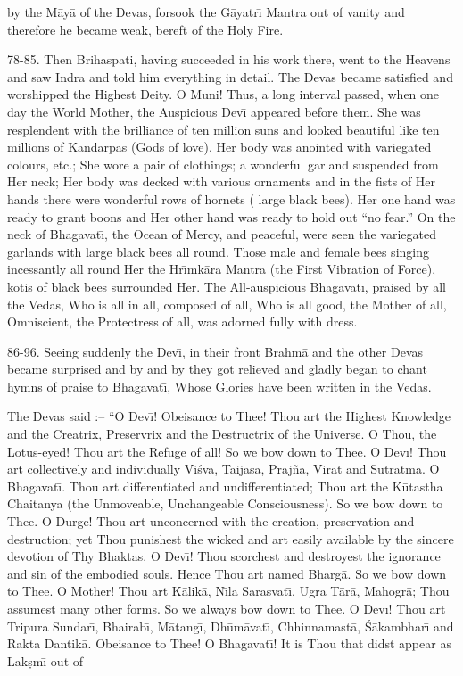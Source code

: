 by the M\=ay\=a of the Devas, forsook the G\=ayatr\={\i} Mantra out of vanity and therefore he became weak, bereft of the Holy Fire.

78-85. Then Brihaspati, having succeeded in his work there, went to the Heavens and saw Indra and told him everything in detail. The Devas became satisfied and worshipped the Highest Deity. O Muni! Thus, a long interval passed, when one day the World Mother, the Auspicious Dev\={\i} appeared before them. She was resplendent with the brilliance of ten million suns and looked beautiful like ten millions of Kandarpas (Gods of love). Her body was anointed with variegated colours, etc.; She wore a pair of clothings; a wonderful garland suspended from Her neck; Her body was decked with various ornaments and in the fists of Her hands there were wonderful rows of hornets ( large black bees). Her one hand was ready to grant boons and Her other hand was ready to hold out ``no fear.'' On the neck of Bhagavat\={\i}, the Ocean of Mercy, and peaceful, were seen the variegated garlands with large black bees all round. Those male and female bees singing incessantly all round Her the Hr\={\i}mk\=ara Mantra (the First Vibration of Force), kotis of black bees surrounded Her. The All-auspicious Bhagavat\={\i}, praised by all the Vedas, Who is all in all, composed of all, Who is all good, the Mother of all, Omniscient, the Protectress of all, was adorned fully with dress.

86-96. Seeing suddenly the Dev\={\i}, in their front Brahm\=a and the other Devas became surprised and by and by they got relieved and gladly began to chant hymns of praise to Bhagavat\={\i}, Whose Glories have been written in the Vedas.

The Devas said :-- ``O Dev\={\i}! Obeisance to Thee! Thou art the Highest Knowledge and the Creatrix, Preservrix and the Destructrix of the Universe. O Thou, the Lotus-eyed! Thou art the Refuge of all! So we bow down to Thee. O Dev\={\i}! Thou art collectively and individually Vi\'sva, Taijasa, Pr\=aj\~na, Vir\=at and S\=utr\=atm\=a. O Bhagavat\={\i}. Thou art differentiated and undifferentiated; Thou art the K\=utastha Chaitanya (the Unmoveable, Unchangeable Consciousness). So we bow down to Thee. O Durge! Thou art unconcerned with the creation, preservation and destruction; yet Thou punishest the wicked and art easily available by the sincere devotion of Thy Bhaktas. O Dev\={\i}! Thou scorchest and destroyest the ignorance and sin of the embodied souls. Hence Thou art named Bharg\=a. So we bow down to Thee. O Mother! Thou art K\=alik\=a, N\={\i}la Sarasvat\={\i}, Ugra T\=ar\=a, Mahogr\=a; Thou assumest many other forms. So we always bow down to Thee. O Dev\={\i}! Thou art Tripura Sundar\={\i}, Bhairab\={\i}, M\=atang\={\i}, Dh\=um\=avat\={\i}, Chhinnamast\=a, \'S\=akambhar\={\i} and Rakta Dantik\=a. Obeisance to Thee! O Bhagavat\={\i}! It is Thou that didst appear as Lak\d{s}m\={\i} out of

